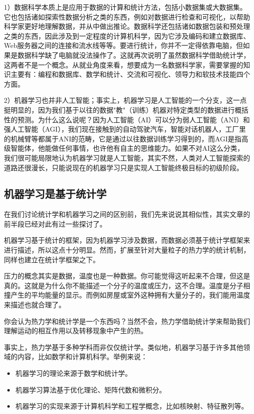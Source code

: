 1）数据科学本质上是应用于数据的计算和统计方法，包括小数据集或大数据集。它也包括诸如探索性数据分析之类的东西，例如对数据进行检查和可视化，以帮助科学家更好地理解数据，并从中做出推论。数据科学还包括诸如数据包装和预处理之类的东西，因此涉及到一定程度的计算机科学，因为它涉及编码和建立数据库、Web服务器之间的连接和流水线等等。要进行统计，你并不一定得依靠电脑，但如果是数据科学缺了电脑就没法操作了。这就再次说明了虽然数据科学借助统计学，这两者不是一个概念。从就业角度来看，想要成为一名数据科学家，需要掌握的知识主要有：编程和数据库、数学和统计、交流和可视化、领导力和软技术技能四个方面。

2）机器学习也并非人工智能；事实上，机器学习是人工智能的一个分支，这一点挺明显的，因为我们基于以往的数据"教"（训练）机器对特定类型的数据进行概括性的预测。为什么这么说呢？因为人工智能（AI）可以分为弱人工智能（ANI）和强人工智能（AGI），我们现在接触到的自动驾驶汽车，智能对话机器人，工厂里的机械臂等都属于ANI的范畴，它是通过以往数据训练学习得到的，而AGI是指高级智能体，他能做任何事情，也许他有自主的思维能力。如果不对AI这么分类，我们很可能局限地认为机器学习就是人工智能，其实不然，人类对人工智能探索的道路还很漫长，只能说现在的机器学习只是实现人工智能终极目标的初级阶段。

\subsection{机器学习是基于统计学}

在我们讨论统计学和机器学习之间的区别前，我们先来说说其相似性，其实文章的前半段已经对此有过一些探讨了。

机器学习基于统计的框架，因为机器学习涉及数据，而数据必须基于统计学框架来进行描述，所以这点十分明显。然而，扩展至针对大量粒子的热力学的统计机制，同样也建立在统计学框架之下。

压力的概念其实是数据，温度也是一种数据。你可能觉得这听起来不合理，但这是真的。这就是为什么你不能描述一个分子的温度或压力，这不合理。温度是分子相撞产生的平均能量的显示。而例如房屋或室外这种拥有大量分子的，我们能用温度来描述也就合理了。

你会认为热力学和统计学是一个东西吗？当然不会，热力学借助统计学来帮助我们理解运动的相互作用以及转移现象中产生的热。

事实上，热力学基于多种学科而非仅仅统计学。类似地，机器学习基于许多其他领域的内容，比如数学和计算机科学。举例来说：

\begin{itemize}
	\item 机器学习的理论来源于数学和统计学。
	\item 机器学习算法基于优化理论、矩阵代数和微积分。
	\item 机器学习的实现来源于计算机科学和工程学概念，比如核映射、特征散列等。
\end{itemize}

